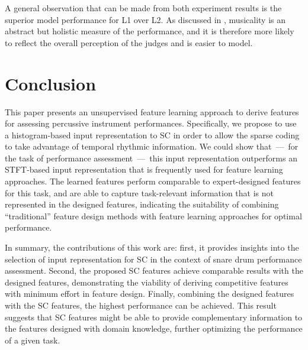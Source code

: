 \documentclass{article}
\begin{document}
A general observation that can be made from both experiment results is the superior model performance for L1 over L2. As discussed in \cite{Wu2016}, musicality is an abstract but holistic measure of the performance, and it is therefore more likely to reflect the overall perception of the judges and is easier to model. %

\section{Conclusion}\label{sec:conclusion}
This paper presents an unsupervised feature learning approach to derive features for assessing percussive instrument performances. Specifically, we propose to use a histogram-based input representation to SC in order to allow the sparse coding to take advantage of temporal rhythmic information. We could show that~---~for the task of performance assessment~---~this input representation outperforms an STFT-based input representation that is frequently used for feature learning approaches. The learned features perform comparable to expert-designed features for this task, and are able to capture task-relevant information that is not represented in the designed features, indicating the suitability of combining ``traditional'' feature design methods with feature learning approaches for optimal performance.

In summary, the contributions of this work are: 
first, it provides insights into the selection of input representation for SC in the context of snare drum performance assessment. 
Second, the proposed SC features achieve comparable results with the designed features, demonstrating the viability of deriving competitive features with minimum effort in feature design. 
Finally, combining the designed features with the SC features, the highest performance can be achieved. This result suggests that SC features might be able to provide complementary information to the features designed with domain knowledge, further optimizing the performance of a given task. 
\end{document}
